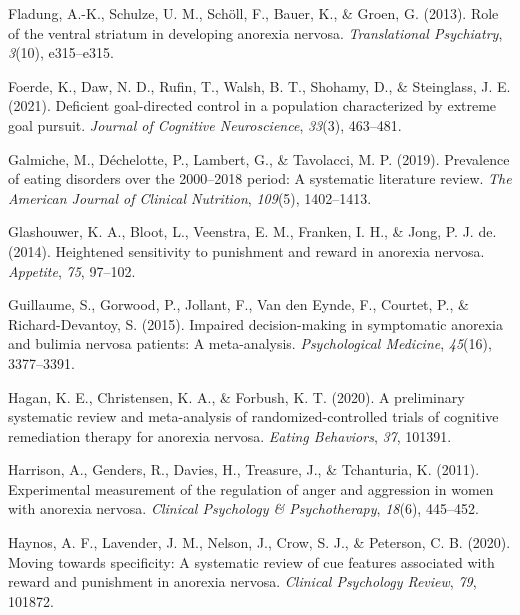 \documentclass[
  man,floatsintext]{apa6}
\newlength{\cslhangindent}
\newlength{\cslentryspacingunit} %
\newenvironment{CSLReferences}[2] %
 {%
  \setlength{\parindent}{0pt}
  \ifodd #1
  \let\oldpar\par
  \def\par{\hangindent=\cslhangindent\oldpar}
  \fi
  \setlength{\parskip}{#2\cslentryspacingunit}
 }%
 {}
\begin{document}
\begin{CSLReferences}{1}{0}
\leavevmode{}%
Fladung, A.-K., Schulze, U. M., Schöll, F., Bauer, K., \& Groen, G. (2013). Role of the ventral striatum in developing anorexia nervosa. \emph{Translational Psychiatry}, \emph{3}(10), e315--e315.

\leavevmode{}%
Foerde, K., Daw, N. D., Rufin, T., Walsh, B. T., Shohamy, D., \& Steinglass, J. E. (2021). Deficient goal-directed control in a population characterized by extreme goal pursuit. \emph{Journal of Cognitive Neuroscience}, \emph{33}(3), 463--481.

\leavevmode{}%
Galmiche, M., Déchelotte, P., Lambert, G., \& Tavolacci, M. P. (2019). Prevalence of eating disorders over the 2000--2018 period: A systematic literature review. \emph{The American Journal of Clinical Nutrition}, \emph{109}(5), 1402--1413.

\leavevmode{}%
Glashouwer, K. A., Bloot, L., Veenstra, E. M., Franken, I. H., \& Jong, P. J. de. (2014). Heightened sensitivity to punishment and reward in anorexia nervosa. \emph{Appetite}, \emph{75}, 97--102.

\leavevmode{}%
Guillaume, S., Gorwood, P., Jollant, F., Van den Eynde, F., Courtet, P., \& Richard-Devantoy, S. (2015). Impaired decision-making in symptomatic anorexia and bulimia nervosa patients: A meta-analysis. \emph{Psychological Medicine}, \emph{45}(16), 3377--3391.

\leavevmode{}%
Hagan, K. E., Christensen, K. A., \& Forbush, K. T. (2020). A preliminary systematic review and meta-analysis of randomized-controlled trials of cognitive remediation therapy for anorexia nervosa. \emph{Eating Behaviors}, \emph{37}, 101391.

\leavevmode{}%
Harrison, A., Genders, R., Davies, H., Treasure, J., \& Tchanturia, K. (2011). Experimental measurement of the regulation of anger and aggression in women with anorexia nervosa. \emph{Clinical Psychology \& Psychotherapy}, \emph{18}(6), 445--452.

\leavevmode{}%
Haynos, A. F., Lavender, J. M., Nelson, J., Crow, S. J., \& Peterson, C. B. (2020). Moving towards specificity: A systematic review of cue features associated with reward and punishment in anorexia nervosa. \emph{Clinical Psychology Review}, \emph{79}, 101872.


\end{CSLReferences}
\end{document}
